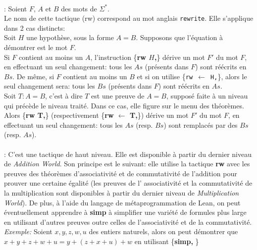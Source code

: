 \paragraph {}: Soient $F$, $A$ et $B$ des mots de $\Sigma^*$.\\
Le nom de cette tactique (rw) correspond au mot anglais \texttt{rewrite}. Elle s'applique dans 2 cas distincts:\\
Soit $H$ une hypothèse, sous la forme $A=B$. Supposons que l'équation à démontrer est le mot $F$. \\Si $F$ contient au moins un $A$, l'instruction \big\{\textbf{rw $H$,}\big\} dérive un mot $F'$ du mot $F$, en effectuant un seul changement: tous les $As$ (présents dans $F$) sont réécrits en $Bs$. De même, si $F$ contient au moins un $B$ et si on utilise \big\{\texttt{rw $\leftarrow$ H,}\big\}, alors le seul changement sera: tous les $Bs$ (présents dans $F$) sont réécrits en $As$.\\
Soit $T: A=B$, c'est à dire $T$ est une preuve de $A=B$, supposé faite à un niveau qui précède le niveau traité. Dans ce cas, elle figure sur le menu des théorèmes. Alors \big\{\textbf{rw T,}\big\} (respectivement \big\{\textbf{rw $\leftarrow$ T,}\big\}) dérive un mot $F'$ du mot $F$, en effectuant un seul changement: tous les $As$ (resp. $Bs$) sont remplacés par des $Bs$ (resp. $As$). 

\paragraph {}: C'est une tactique de haut niveau. Elle est disponible à partir du dernier niveau de \textit{Addition World}. Son principe est le suivant: elle utilise la tactique \textbf{rw} avec les preuves des théorèmes d'associativité et de commutativité de l'addition pour prouver une certaine égalité (les preuves de l' associativité et la commutativité de la multiplication sont disponibles à partir du dernier niveau de \textit{Multiplication World}). De plus, à l'aide du langage de métaprogrammation de Lean, on peut éventuellement apprendre  à \textbf{simp} à simplifier une variété de formules plus large en utilisant d'autres preuves outre celles de l'associativité et de la commutativité.   \\
\textit{Exemple:} Soient $x,y,z,w,u$ des entiers naturels, alors on peut démontrer que $x+y+z+w+u=y+(z+x+u)+w$ en utilisant \big\{\textbf{simp,} \big\}

